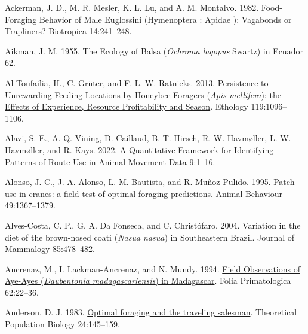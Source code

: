 \documentclass[twoside,12pt,final]{ucthesis-CA2012}
\newenvironment{CSLReferences}%
  {}%
  {\par}
\begin{document}
\begin{ucmainmatter}
\noindent

\setlength{\parindent}{-0.20in}
\setlength{\leftskip}{0.20in}
\setlength{\parskip}{8pt}

\hypertarget{refs}{}
\begin{CSLReferences}{1}{0}
\leavevmode{}%
Ackerman, J. D., M. R. Mesler, K. L. Lu, and A. M. Montalvo. 1982. Food-Foraging Behavior of Male Euglossini (Hymenoptera : Apidae ): Vagabonds or Trapliners? Biotropica 14:241--248.

\leavevmode{}%
Aikman, J. M. 1955. The Ecology of Balsa (\emph{Ochroma lagopus} Swartz) in Ecuador 62.

\leavevmode{}%
Al Toufailia, H., C. Grüter, and F. L. W. Ratnieks. 2013. \href{https://doi.org/10.1111/eth.12170}{Persistence to Unrewarding Feeding Locations by Honeybee Foragers (\emph{Apis mellifera}): the Effects of Experience, Resource Profitability and Season}. Ethology 119:1096--1106.

\leavevmode{}%
Alavi, S. E., A. Q. Vining, D. Caillaud, B. T. Hirsch, R. W. Havmøller, L. W. Havmøller, and R. Kays. 2022. \href{https://doi.org/10.3389/fevo.2021.743014}{A Quantitative Framework for Identifying Patterns of Route-Use in Animal Movement Data} 9:1--16.

\leavevmode{}%
Alonso, J. C., J. A. Alonso, L. M. Bautista, and R. Muñoz-Pulido. 1995. \href{https://doi.org/10.1006/anbe.1995.0167}{Patch use in cranes: a field test of optimal foraging predictions}. Animal Behaviour 49:1367--1379.

\leavevmode{}%
Alves-Costa, C. P., G. A. Da Fonseca, and C. Christófaro. 2004. Variation in the diet of the brown-nosed coati (\emph{Nasua nasua}) in Southeastern Brazil. Journal of Mammalogy 85:478--482.

\leavevmode{}%
Ancrenaz, M., I. Lackman-Ancrenaz, and N. Mundy. 1994. \href{https://doi.org/10.1159/000156760}{Field Observations of Aye-Ayes (\emph{Daubentonia madagascariensis}) in Madagascar}. Folia Primatologica 62:22--36.

\leavevmode{}%
Anderson, D. J. 1983. \href{https://doi.org/10.1016/0040-5809(83)90038-2}{Optimal foraging and the traveling salesman}. Theoretical Population Biology 24:145--159.


\end{CSLReferences}
\end{ucmainmatter}
\end{document}
